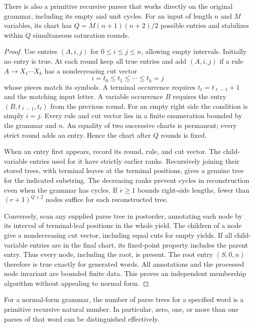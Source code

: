 \begin{theorem}
\label{cf:chart}
There is also a primitive recursive parser that works directly on the
original grammar, including its empty and unit cycles.  For an input of
length $n$ and $M$ variables, its chart has
$Q=M(n+1)(n+2)/2$ possible entries and stabilizes within $Q$ simultaneous
saturation rounds.
\end{theorem}

\begin{proof}
Use entries $(A,i,j)$ for $0\leq i\leq j\leq n$, allowing empty intervals.
Initially no entry is true.  At each round keep all true entries and add
$(A,i,j)$ if a rule $A\to X_1\cdots X_k$ has a nondecreasing cut vector
\[
                  i=t_0\leq t_1\leq\cdots\leq t_k=j
\]
whose pieces match its symbols.  A terminal occurrence requires
$t_\ell=t_{\ell-1}+1$ and the matching input letter.  A variable occurrence
$B$ requires the entry $(B,t_{\ell-1},t_\ell)$ from the previous round.
For an empty right side the condition is simply $i=j$.  Every rule and
cut vector lies in a finite enumeration bounded by the grammar and $n$.
An equality of two successive charts is permanent; every strict round
adds an entry.  Hence the chart after $Q$ rounds is fixed.

When an entry first appears, record its round, rule, and cut vector.
The child-variable entries used for it have strictly earlier ranks.
Recursively joining their stored trees, with terminal leaves at the
terminal positions, gives a genuine tree for the indicated substring.
The decreasing ranks prevent cycles in reconstruction even when the
grammar has cycles.  If $r\geq1$ bounds right-side lengths, fewer than
$(r+1)^{Q+2}$ nodes suffice for each reconstructed tree.

Conversely, scan any supplied parse tree in postorder, annotating each
node by its interval of terminal-leaf positions in the whole yield.
The children of a node give a nondecreasing cut vector, including equal
cuts for empty yields.  If all child-variable entries are in the final
chart, its fixed-point property includes the parent entry.  Thus every
node, including the root, is present.  The root entry $(S,0,n)$ therefore
is true exactly for generated words.  All annotations and the processed
node invariant are bounded finite data.  This proves an independent
membership algorithm without appealing to normal form.
\end{proof}

\begin{proposition}
\label{cf:parse-count}
For a normal-form grammar, the number of parse trees for a specified word
is a primitive recursive natural number.  In particular, zero, one, or
more than one parses of that word can be distinguished effectively.
\end{proposition}


